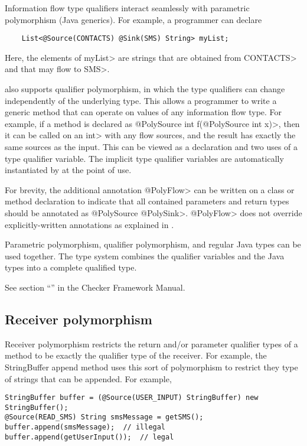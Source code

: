 Information flow type qualifiers interact seamlessly with parametric polymorphism (Java
generics).  For example, a programmer can declare

\begin{Verbatim}
    List<@Source(CONTACTS) @Sink(SMS) String> myList;
\end{Verbatim}
\noindent
Here, the elements of \<myList> are strings
that are obtained from \<CONTACTS> and that may flow to \<SMS>.

\TheFlowChecker also supports qualifier polymorphism, in
which the type qualifiers can change independently of the underlying type.
This allows a programmer to write a generic method that can operate on values of
any information flow type.
For example, if a method is declared as
\<@PolySource int f(@PolySource int x)>, then it can be called on an \<int>
with any flow sources, and the result has exactly the same sources as the
input.  This can be viewed as a declaration and two uses of a type
qualifier variable.  The implicit type qualifier variables are
automatically instantiated by \theFlowChecker at the point of use.

For brevity,
the additional
annotation \<@PolyFlow> can be written on a class or method declaration to indicate that
all contained parameters and return types should be annotated as \<@PolySource
@PolySink>.  \<@PolyFlow> does not override explicitly-written annotations as explained
in .


Parametric polymorphism, qualifier polymorphism, and regular Java types can
be used together.  The type system combines the
qualifier variables and the Java types into a complete qualified type.

See section ``'' in the Checker Framework Manual.  

\subsection{Receiver polymorphism}

Receiver polymorphism restricts the return and/or parameter qualifier types of a method to be exactly 
the qualifier type of the receiver. 
For example, the StringBuffer append method uses this sort of polymorphism to restrict they type of strings that can be appended.  For example,

\begin{Verbatim}
StringBuffer buffer = (@Source(USER_INPUT) StringBuffer) new StringBuffer();
@Source(READ_SMS) String smsMessage = getSMS();
buffer.append(smsMessage);  // illegal
buffer.append(getUserInput());  // legal
 \end{Verbatim}
 
